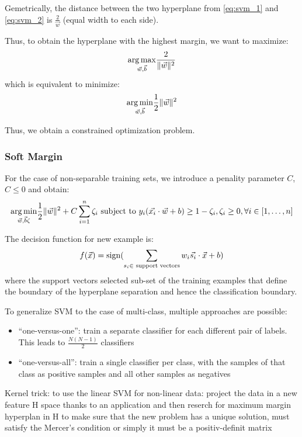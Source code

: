 Gemetrically, the distance between the two hyperplane from \ref{eq:svm_1} and \ref{eq:svm_2} is $\frac{2}{\vec{w}}$ (equal width to each side).

Thus, to obtain the hyperplane with the highest margin, we want to maximize:
$$ \underset {\vec{w}, \vec{b}}{\operatorname {arg\,max}} \frac{2}{\lVert \vec{w} \rVert^2} $$
which is equivalent to minimize:
$$ \underset {\vec{w}, \vec{b}}{\operatorname {arg\,min}} \frac{1}{2} \lVert \vec{w} \rVert^2 $$

Thus, we obtain a constrained optimization problem.

\subsubsection{Soft Margin}

For the case of non-separable training sets, we introduce a penality parameter $C$, $C \leq 0$ and obtain:
$$
\underset {\vec{w}, \vec{b} \zeta}{\operatorname {arg\,min}} \frac{1}{2} \lVert \vec{w} \rVert^2 + C \sum_{i = 1}^{n} \zeta_i
\text{ subject to } y_i (\vec{x_i} \cdot \vec{w} + b) \geq 1 - \zeta_i, \zeta_i \geq 0, \forall i \in [1, \ldots, n]
$$

The decision function for new example is:
$$
f(\vec{x}) = \operatorname {sign} (\sum_{s_i \in \text{ support vectors}} w_i \vec{s_i} \cdot \vec{x} + b)
$$
where the support vectors selected sub-set of the training  examples that define the boundary of the hyperplane separation and hence the classification boundary.

To generalize SVM to the case of multi-class, multiple approaches are possible:
\begin{itemize}
    \item \enquote{one-versus-one}: train a separate classifier for each different pair of labels. This leads to $\frac{N (N - 1)}{2}$ classifiers
    \item \enquote{one-versus-all}: train a single classifier per class, with the samples of that class as positive samples and all other samples as negatives
\end{itemize}

Kernel trick:
to use the linear SVM for non-linear data: project the data in a new feature H space thanks to an application and then reserch for maximum margin hyperplan in H
to make sure that the new problem has a unique solution, 
must satisfy the Mercer's condition or simply it must be a positiv-definit matrix


